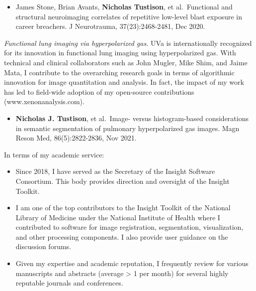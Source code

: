\documentclass[
  11pt,
]{article}
\providecommand{\tightlist}{%
  \setlength{\itemsep}{0pt}\setlength{\parskip}{0pt}}
\begin{document}
\begin{itemize}
\tightlist
\item
  James Stone, Brian Avants, \textbf{Nicholas Tustison}, et
  al.~Functional and structural neuroimaging correlates of repetitive
  low-level blast exposure in career breachers. J Neurotrauma,
  37(23):2468-2481, Dec 2020.
\end{itemize}

\emph{Functional lung imaging via hyperpolarized gas.} UVa is
internationally recognized for its innovation in functional lung imaging
using hyperpolarized gas. With technical and clinical collaborators such
as John Mugler, Mike Shim, and Jaime Mata, I contribute to the
overarching research goals in terms of algorithmic innovation for image
quantitation and analysis. In fact, the impact of my work has led to
field-wide adoption of my open-source contributions
(www.xenonanalysis.com).

\begin{itemize}
\tightlist
\item
  \textbf{Nicholas J. Tustison}, et al.~Image- versus histogram-based
  considerations in semantic segmentation of pulmonary hyperpolarized
  gas images. Magn Reson Med, 86(5):2822-2836, Nov 2021.
\end{itemize}

In terms of my academic service:

\begin{itemize}
\tightlist
\item
  Since 2018, I have served as the Secretary of the Insight Software
  Consortium. This body provides direction and oversight of the Insight
  Toolkit.
\item
  I am one of the top contributors to the Insight Toolkit of the
  National Library of Medicine under the National Institute of Health
  where I contributed to software for image registration, segmentation,
  visualization, and other processing components. I also provide user
  guidance on the discussion forums.
\item
  Given my expertise and academic reputation, I frequently review for
  various manuscripts and abstracts (average \textgreater{} 1 per month)
  for several highly reputable journals and conferences.
\end{itemize}
\end{document}
